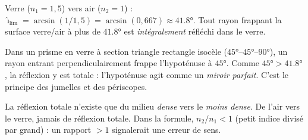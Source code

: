 \documentclass[11pt,a4paper]{article}
\begin{document}
\begin{exemplebox}
Verre ($n_1=1{,}5$) vers air ($n_2=1$) : $\hat{\imath}_{\text{lim}}=\arcsin(1/1{,}5)=\arcsin(0{,}667)
\approx\ang{41.8}$. Tout rayon frappant la surface verre/air à plus de $\ang{41.8}$ est
\emph{intégralement} réfléchi dans le verre.
\end{exemplebox}

\begin{exemplebox}
Dans un prisme en verre à section triangle rectangle isocèle ($\ang{45}$–$\ang{45}$–$\ang{90}$), un
rayon entrant perpendiculairement frappe l'hypoténuse à $\ang{45}$. Comme $\ang{45}>\ang{41.8}$, la
réflexion y est totale : l'hypoténuse agit comme un \emph{miroir parfait}. C'est le principe des
jumelles et des périscopes.
\end{exemplebox}

\begin{piege}
La réflexion totale n'existe que du milieu \emph{dense} vers le \emph{moins dense}. De l'air vers le
verre, jamais de réflexion totale. Dans la formule, $n_2/n_1<1$ (petit indice divisé par grand) :
un rapport $>1$ signalerait une erreur de sens.
\end{piege}
\end{document}
